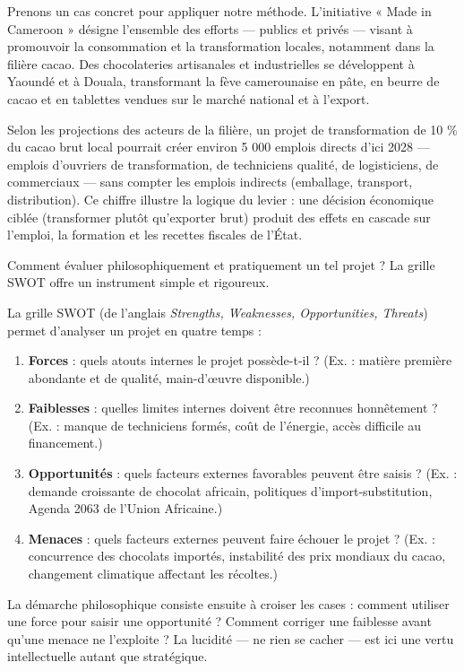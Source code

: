 \documentclass[11pt]{article}
\newcommand{\cle}[1]{{\popxbold\color{popdark}#1}}
\begin{document}
Prenons un cas concret pour appliquer notre méthode. L'initiative « Made in Cameroon » désigne l'ensemble des efforts — publics et privés — visant à promouvoir la consommation et la transformation locales, notamment dans la filière cacao. Des chocolateries artisanales et industrielles se développent à Yaoundé et à Douala, transformant la fève camerounaise en pâte, en beurre de cacao et en tablettes vendues sur le marché national et à l'export.

\begin{exemplebox}
Selon les projections des acteurs de la filière, un projet de transformation de 10 \% du cacao brut local pourrait créer environ 5 000 emplois directs d'ici 2028 — emplois d'ouvriers de transformation, de techniciens qualité, de logisticiens, de commerciaux — sans compter les emplois indirects (emballage, transport, distribution). Ce chiffre illustre la logique du levier : une décision économique ciblée (transformer plutôt qu'exporter brut) produit des effets en cascade sur l'emploi, la formation et les recettes fiscales de l'État.
\end{exemplebox}

Comment évaluer philosophiquement et pratiquement un tel projet ? La grille SWOT offre un instrument simple et rigoureux.

\begin{methode}
La grille \cle{SWOT} (de l'anglais \emph{Strengths, Weaknesses, Opportunities, Threats}) permet d'analyser un projet en quatre temps :
\begin{enumerate}
\item \textbf{Forces} : quels atouts internes le projet possède-t-il ? (Ex. : matière première abondante et de qualité, main-d'œuvre disponible.)
\item \textbf{Faiblesses} : quelles limites internes doivent être reconnues honnêtement ? (Ex. : manque de techniciens formés, coût de l'énergie, accès difficile au financement.)
\item \textbf{Opportunités} : quels facteurs externes favorables peuvent être saisis ? (Ex. : demande croissante de chocolat africain, politiques d'import-substitution, Agenda 2063 de l'Union Africaine.)
\item \textbf{Menaces} : quels facteurs externes peuvent faire échouer le projet ? (Ex. : concurrence des chocolats importés, instabilité des prix mondiaux du cacao, changement climatique affectant les récoltes.)
\end{enumerate}
La démarche philosophique consiste ensuite à croiser les cases : comment utiliser une force pour saisir une opportunité ? Comment corriger une faiblesse avant qu'une menace ne l'exploite ? La lucidité — ne rien se cacher — est ici une vertu intellectuelle autant que stratégique.
\end{methode}
\end{document}
